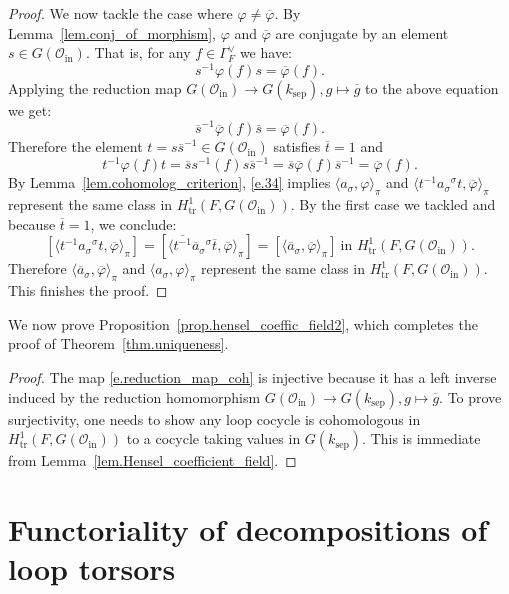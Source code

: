 \documentclass[12pt]{amsart}
\numberwithin{equation}{section}
\theoremstyle{definition}
\newcommand{\cO}{\mathcal{O}}
\newcommand{\sep}{\operatorname{sep}}
\newcommand{\tr}{\operatorname{tr}}
\newcommand{\ksep}{k_{\sep}}
\newcommand{\oin}{\operatorname{in}}
\newcommand{\Oin}{\cO_{\oin}}
\newcommand{\vphi}{\varphi}
\newcommand{\I}[1]{\Gamma_{#1}^{\vee}}
\begin{document}
\begin{proof}
    We now tackle the case where $\vphi \neq \overline{\vphi}$. By Lemma~\ref{lem.conj_of_morphism}, $\vphi$ and $\overline{\vphi}$ are conjugate by an element $s\in G(\Oin)$. That is, for any $f\in \I{F}$ we have: 
    $$s^{-1} \vphi(f)  s = \overline{\vphi}(f).$$
    Applying the reduction map $G(\Oin) \to G(\ksep), g\mapsto \overline{g}$ to the above equation we get:
    $$\overline{s}^{-1} \overline{\vphi}(f) \overline{s} = \overline{\vphi}(f).$$
    Therefore the element $t = s \overline{s}^{-1} \in G(\Oin)$ satisfies $\overline{t} =1$ and
    \begin{equation}\label{e.34}
        t^{-1} \vphi(f)  t = \overline{s} s^{-1} (f) s \overline{s}^{-1}= \overline{s} \overline{\vphi}(f) \overline{s}^{-1} = \overline{\vphi}(f).
    \end{equation}
    By Lemma~\ref{lem.cohomolog_criterion}, \eqref{e.34} implies $\langle a_\sigma,\vphi\rangle_\pi$ and $\langle t^{-1} a_\sigma {}^\sigma t, \overline{\vphi}\rangle_\pi$ represent the same class in $H^1_{\tr}(F,G(\Oin))$.  By the first case we tackled and because $\overline{t}=1$, we conclude:
     $$[\langle t^{-1} a_\sigma {}^\sigma t, \overline{\vphi}\rangle_\pi] = [\langle \overline{t^{-1}} \overline{a}_\sigma {}^\sigma \overline{t}, \overline{\vphi}\rangle_\pi] = [\langle \overline{a}_\sigma, \overline{\vphi}\rangle_\pi]  \ \text{in }H^1_{\tr}(F,G(\Oin)).$$
    Therefore $\langle  \overline{a}_\sigma, \overline{\vphi}\rangle_\pi$ and $\langle a_\sigma,\vphi\rangle_\pi$ represent the same class in $H^1_{\tr}(F,G(\Oin))$. This finishes the proof.
\end{proof}

We now prove Proposition~\ref{prop.hensel_coeffic_field2}, which completes the proof of Theorem~\ref{thm.uniqueness}. 
\begin{proof}
    The map \eqref{e.reduction_map_coh} is injective because it has a left inverse induced by the reduction homomorphism $G(\Oin)\to G(\ksep), g\mapsto \overline{g}$. To prove surjectivity, one needs to show any loop cocycle is cohomologous in $H^1_{\tr}(F,G(\Oin))$ to a cocycle taking values in $G(\ksep)$. This is immediate from Lemma~\ref{lem.Hensel_coefficient_field}.
\end{proof}

\section{Functoriality of decompositions of loop torsors}\label{sect.funct_of_decomp}
\end{document}
